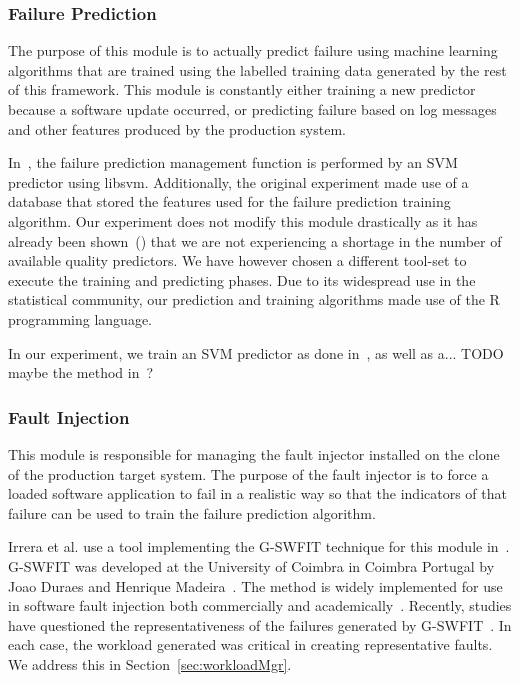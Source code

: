 \subsubsection{Failure Prediction} \label{sec:failurePrediction} %
The purpose of this module is to actually predict failure using machine
learning algorithms that are trained using the labelled training data generated
by the rest of this framework.  This module is constantly either training
a new predictor because a software update occurred, or predicting failure based
on log messages and other features produced by the production system.

In~\cite{irrera2015}, the failure prediction management function is performed
by an SVM predictor using libsvm.  Additionally, the original experiment made
use of a database that stored the features used for the failure prediction
training algorithm.  Our experiment does not modify this module drastically
as it has already been shown~(\cite{salfnerSurvey}) that we are not
experiencing a shortage in the number of available quality predictors.  We have
however chosen a different tool-set to execute the training and predicting
phases.  Due to its widespread use in the statistical community, our prediction
and training algorithms made use of the R programming language.

In our experiment, we train an SVM predictor as done in~\cite{irrera2015}, as
well as a... TODO maybe the method in~\cite{watanabe2014}?

\subsubsection{Fault Injection} \label{sec:faultInjectionMgr}
This module is responsible for managing the fault injector installed on the
clone of the production target system.  The purpose of the fault injector is to
force a loaded software application to fail in a realistic way so that the
indicators of that failure can be used to train the failure prediction
algorithm.

Irrera et al. use a tool implementing the G-SWFIT technique for this module
in~\cite{irrera2015}.  G-SWFIT was developed at the University of Coimbra in
Coimbra Portugal by Joao Duraes and Henrique Madeira~\cite{gswfit}.  The method
is widely implemented for use in software fault injection both commercially and
academically~\cite{natella2010,irrera2014,cotroneo2012,umadevi2015}.  Recently,
studies have questioned the representativeness of the failures generated by
G-SWFIT~\cite{kikuchi2014}.  In each case, the workload generated was critical
in creating representative faults.  We address this in
Section~\ref{sec:workloadMgr}.

